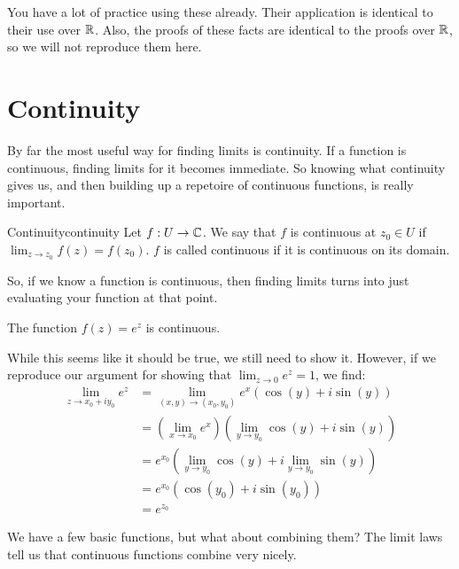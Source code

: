 You have a lot of practice using these already. Their application is identical to their use over $\mathbb{R}$. Also, the proofs of these facts are identical to the proofs over $\mathbb{R}$, so we will not reproduce them here.

\section{Continuity}

By far the most useful way for finding limits is continuity. If a function is continuous, finding limits for it becomes immediate. So knowing what continuity gives us, and then building up a repetoire of continuous functions, is really important.

\begin{defbo}{Continuity}{continuity}
Let $f:U\rightarrow \mathbb{C}$. We say that $f$ is continuous at $z_0 \in U$ if $\lim_{z\rightarrow z_0} f(z) = f(z_0)$. $f$ is called continuous if it is continuous on its domain.
\end{defbo}

So, if we know a function is continuous, then finding limits turns into just evaluating your function at that point.

\begin{ex}{}{} The function $f(z) = e^z$ is continuous.

While this seems like it should be true, we still need to show it. However, if we reproduce our argument for showing that $\lim_{z\rightarrow 0} e^z = 1$, we find:
\begin{align*}\lim_{z\rightarrow x_0 + iy_0} e^z &= \lim_{(x,y) \rightarrow (x_0,y_0)} e^x(\cos(y) + i\sin(y))\\
&= \left(\lim_{x\rightarrow x_0}e^x\right)\left( \lim_{y\rightarrow y_0} \cos(y) + i\sin(y)\right)\\
&= e^{x_0}\left( \lim_{y\rightarrow y_0} \cos(y) + i\lim_{y\rightarrow y_0}\sin(y)\right)\\
&= e^{x_0}(\cos(y_0) + i\sin(y_0))\\
&= e^{z_0}
\end{align*}

\end{ex}


We have a few basic functions, but what about combining them? The limit laws tell us that continuous functions combine very nicely.

